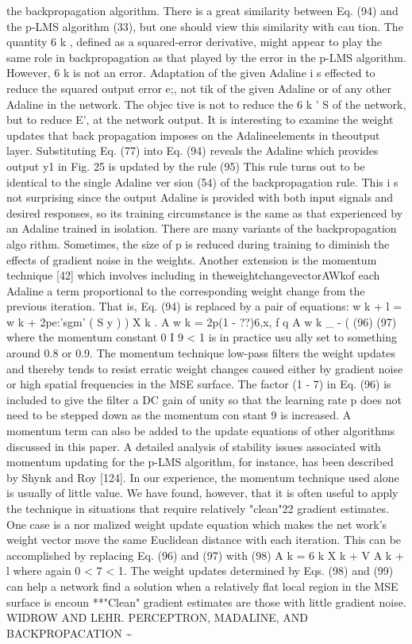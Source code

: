 \documentclass[11pt,a4paper,twocolumn]{article}
\begin{document}
{{the backpropagation algorithm. 
There is a great similarity between Eq. (94) and the p-LMS 
algorithm (33), but one should view this similarity with cau
tion. The quantity 6 k ,  defined as a squared-error derivative, 
might appear to play the same role in backpropagation as 
that played by the error in the p-LMS algorithm. However, 
6 k  is not an error. Adaptation of the given Adaline i s  effected 
to reduce the squared output error e;, not tik of the given 
Adaline or of any other Adaline in the network. The objec
tive is not to reduce the 6 k ' S  of the network, but to reduce 
E', at the network output. 
It is interesting to examine the weight updates that back
propagation imposes on the Adalineelements in theoutput 
layer. Substituting Eq. (77) into Eq. (94) reveals the Adaline 
which provides output y1 in Fig. 25 is updated by the rule 
(95) 
This rule turns out to be identical to the single Adaline ver
sion (54) of the backpropagation rule. This i s  not surprising 
since the output Adaline is provided with both input signals 
and desired responses, so its training circumstance is the 
same as that experienced by an Adaline trained in isolation. 
There are many variants of the backpropagation algo
rithm. Sometimes, the size of p is reduced during training 
to diminish the effects of gradient noise in the weights. 
Another extension is the momentum technique [42] which 
involves including in theweightchangevectorAWkof each 
Adaline a term proportional to the corresponding weight 
change from the previous iteration. That is, Eq. (94) is 
replaced by a pair of equations: 
w k + l  = w k  + 2pe:'sgm' 
( S y ) ) X k .  
A w k  = 2p(1 - ??)6,x, f q A w k \_ - (  
(96) 
(97) 
where the momentum constant 0 I 
9 < 1 is in practice usu
ally set to something around 0.8 or 0.9. 
The momentum technique low-pass filters the weight 
updates and thereby tends to resist erratic weight changes 
caused either by gradient noise or high spatial frequencies 
in the MSE surface. The factor (1 - 7) in Eq. (96) is included 
to give the filter a DC gain of unity so that the learning rate 
p does not need to be stepped down as the momentum con
stant 9 is increased. A momentum term can also be added 
to the update equations of other algorithms discussed in 
this paper. A detailed analysis of stability issues associated 
with momentum updating for the p-LMS algorithm, for 
instance, has been described by Shynk and Roy [124]. 
In our experience, the momentum technique used alone 
is usually of little value. We have found, however, that it is 
often useful to apply the technique in situations that require 
relatively "clean"22 gradient estimates. One case is a nor
malized weight update equation which makes the net
work's weight vector move the same Euclidean distance 
with each iteration. This can be accomplished by replacing 
Eq. (96) and (97) with 
(98) 
A k  = 6 k X k  + V A k + l  
where again 0 < 7 < 1. The weight updates determined by 
Eqs. (98) and (99) can help a network find a solution when 
a relatively flat local region in the MSE surface is encoun
**"Clean" gradient estimates are those with little gradient noise. 
WIDROW AND LEHR. PERCEPTRON, MADALINE, AND BACKPROPACATION 
\~{} 






}}
\end{document}
